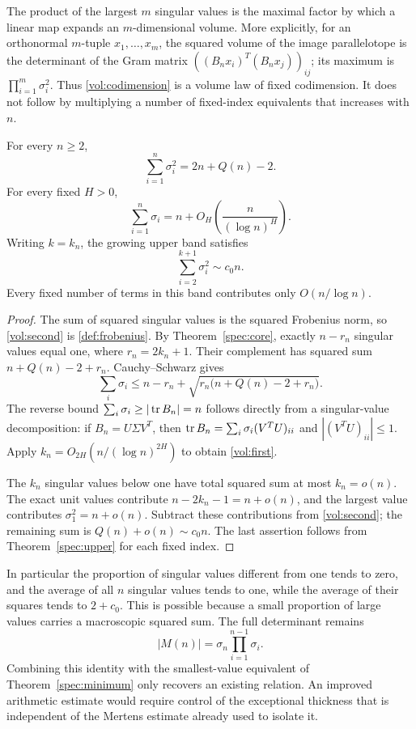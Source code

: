 The product of the largest $m$ singular values is the maximal factor by which a linear map expands an $m$-dimensional volume. More explicitly, for an orthonormal $m$-tuple $x_1,\ldots,x_m$, the squared volume of the image parallelotope is the determinant of the Gram matrix $((B_nx_i)^T(B_nx_j))_{ij}$; its maximum is $\prod_{i=1}^m\sigma_i^2$. Thus \eqref{vol:codimension} is a volume law of fixed codimension. It does not follow by multiplying a number of fixed-index equivalents that increases with $n$.

\begin{theorem}\label{vol:sums}
For every $n\ge2$,
\begin{equation}\label{vol:second}
 \sum_{i=1}^n\sigma_i^2=2n+Q(n)-2.
\end{equation}
For every fixed $H>0$,
\begin{equation}\label{vol:first}
 \sum_{i=1}^n\sigma_i=n+O_H\left(\frac{n}{(\log n)^H}\right).
\end{equation}
Writing $k=k_n$, the growing upper band satisfies
\begin{equation}\label{vol:band}
 \sum_{i=2}^{k+1}\sigma_i^2\sim c_0n.
\end{equation}
Every fixed number of terms in this band contributes only $O(n/\log n)$.
\end{theorem}
\begin{proof}
The sum of squared singular values is the squared Frobenius norm, so \eqref{vol:second} is \eqref{def:frobenius}. By Theorem~\ref{spec:core}, exactly $n-r_n$ singular values equal one, where $r_n=2k_n+1$. Their complement has squared sum $n+Q(n)-2+r_n$. Cauchy--Schwarz gives
\[
 \sum_i\sigma_i\le n-r_n+
       \sqrt{r_n\bigl(n+Q(n)-2+r_n\bigr)}.
\]
The reverse bound $\sum_i\sigma_i\ge|\operatorname{tr} B_n|=n$ follows directly from a singular-value decomposition: if $B_n=U\Sigma V^T$, then $\operatorname{tr} B_n=\sum_i\sigma_i(V^TU)_{ii}$ and $|(V^TU)_{ii}|\le1$. Apply $k_n=O_{2H}(n/(\log n)^{2H})$ to obtain \eqref{vol:first}.

The $k_n$ singular values below one have total squared sum at most $k_n=o(n)$. The exact unit values contribute $n-2k_n-1=n+o(n)$, and the largest value contributes $\sigma_1^2=n+o(n)$. Subtract these contributions from \eqref{vol:second}; the remaining sum is $Q(n)+o(n)\sim c_0n$. The last assertion follows from Theorem~\ref{spec:upper} for each fixed index.
\end{proof}

In particular the proportion of singular values different from one tends to zero, and the average of all $n$ singular values tends to one, while the average of their squares tends to $2+c_0$. This is possible because a small proportion of large values carries a macroscopic squared sum. The full determinant remains
\[
 |M(n)|=\sigma_n\prod_{i=1}^{n-1}\sigma_i.
\]
Combining this identity with the smallest-value equivalent of Theorem~\ref{spec:minimum} only recovers an existing relation. An improved arithmetic estimate would require control of the exceptional thickness that is independent of the Mertens estimate already used to isolate it.
